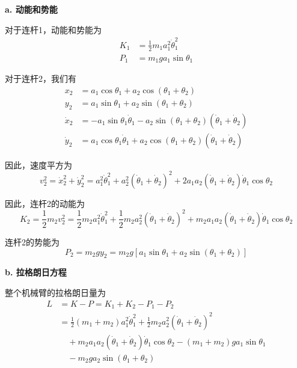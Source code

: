 \documentclass[12pt,a4paper]{ctexart}
\begin{document}
\textbf{a. 动能和势能}

对于连杆1，动能和势能为
\begin{align}
K_1 &= \frac{1}{2}m_1a_1^2\dot{\theta}_1^2 \\
P_1 &= m_1ga_1\sin\theta_1
\end{align}

对于连杆2，我们有
\begin{align}
x_2 &= a_1\cos\theta_1 + a_2\cos(\theta_1+\theta_2) \\
y_2 &= a_1\sin\theta_1 + a_2\sin(\theta_1+\theta_2) \\
\dot{x}_2 &= -a_1\sin\theta_1\dot{\theta}_1 - a_2\sin(\theta_1+\theta_2)(\dot{\theta}_1+\dot{\theta}_2) \\
\dot{y}_2 &= a_1\cos\theta_1\dot{\theta}_1 + a_2\cos(\theta_1+\theta_2)(\dot{\theta}_1+\dot{\theta}_2)
\end{align}

因此，速度平方为
\begin{equation}
v_2^2 = \dot{x}_2^2 + \dot{y}_2^2 = a_1^2\dot{\theta}_1^2 + a_2^2(\dot{\theta}_1+\dot{\theta}_2)^2 + 2a_1a_2(\dot{\theta}_1+\dot{\theta}_2)\dot{\theta}_1\cos\theta_2
\end{equation}

因此，连杆2的动能为
\begin{equation}
K_2 = \frac{1}{2}m_2v_2^2 = \frac{1}{2}m_2a_1^2\dot{\theta}_1^2 + \frac{1}{2}m_2a_2^2(\dot{\theta}_1+\dot{\theta}_2)^2 + m_2a_1a_2(\dot{\theta}_1+\dot{\theta}_2)\dot{\theta}_1\cos\theta_2
\end{equation}

连杆2的势能为
\begin{equation}
P_2 = m_2gy_2 = m_2g[a_1\sin\theta_1 + a_2\sin(\theta_1+\theta_2)]
\end{equation}

\textbf{b. 拉格朗日方程}

整个机械臂的拉格朗日量为
\begin{align}
L &= K - P = K_1 + K_2 - P_1 - P_2 \\
&= \frac{1}{2}(m_1+m_2)a_1^2\dot{\theta}_1^2 + \frac{1}{2}m_2a_2^2(\dot{\theta}_1+\dot{\theta}_2)^2 \\
&\quad + m_2a_1a_2(\dot{\theta}_1+\dot{\theta}_2)\dot{\theta}_1\cos\theta_2 - (m_1+m_2)ga_1\sin\theta_1 \\
&\quad - m_2ga_2\sin(\theta_1+\theta_2)
\end{align}
\end{document}
